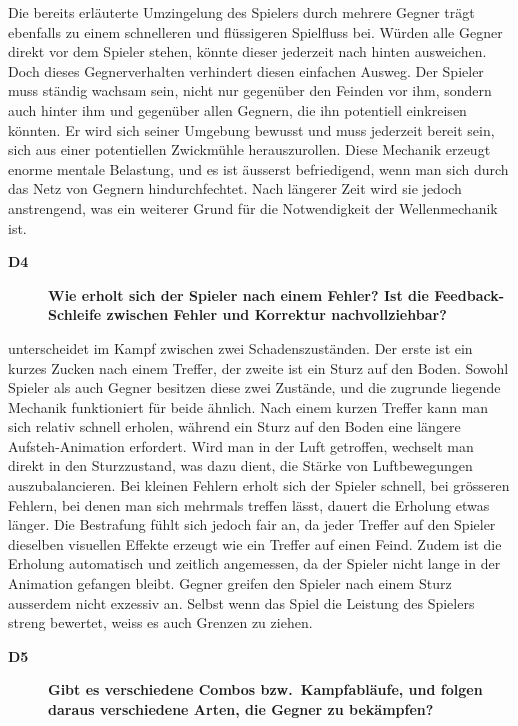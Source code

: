 \documentclass[../Main.tex]{subfiles}
\begin{document}
Die bereits erläuterte Umzingelung des Spielers durch mehrere Gegner trägt ebenfalls zu einem schnelleren und flüssigeren Spielfluss bei. Würden alle Gegner direkt vor dem Spieler stehen, könnte dieser jederzeit nach hinten ausweichen. Doch dieses Gegnerverhalten verhindert diesen einfachen Ausweg. Der Spieler muss ständig wachsam sein, nicht nur gegenüber den Feinden vor ihm, sondern auch hinter ihm und gegenüber allen Gegnern, die ihn potentiell einkreisen könnten. Er wird sich seiner Umgebung bewusst und muss jederzeit bereit sein, sich aus einer potentiellen Zwickmühle herauszurollen. Diese Mechanik erzeugt enorme mentale Belastung, und es ist äusserst befriedigend, wenn man sich durch das Netz von Gegnern hindurchfechtet. Nach längerer Zeit wird sie jedoch anstrengend, was ein weiterer Grund für die Notwendigkeit der Wellenmechanik ist.

\begin{description}
    \item[\textbf{D4}] \textbf{Wie erholt sich der Spieler nach einem Fehler? Ist die Feedback-Schleife zwischen Fehler und Korrektur nachvollziehbar?}
\end{description}

 unterscheidet im Kampf zwischen zwei Schadenszuständen. Der erste ist ein kurzes Zucken nach einem Treffer, der zweite ist ein Sturz auf den Boden. Sowohl Spieler als auch Gegner besitzen diese zwei Zustände, und die zugrunde liegende Mechanik funktioniert für beide ähnlich. Nach einem kurzen Treffer kann man sich relativ schnell erholen, während ein Sturz auf den Boden eine längere Aufsteh-Animation erfordert. Wird man in der Luft getroffen, wechselt man direkt in den Sturzzustand, was dazu dient, die Stärke von Luftbewegungen auszubalancieren. Bei kleinen Fehlern erholt sich der Spieler schnell, bei grösseren Fehlern, bei denen man sich mehrmals treffen lässt, dauert die Erholung etwas länger. Die Bestrafung fühlt sich jedoch fair an, da jeder Treffer auf den Spieler dieselben visuellen Effekte erzeugt wie ein Treffer auf einen Feind. Zudem ist die Erholung automatisch und zeitlich angemessen, da der Spieler nicht lange in der Animation gefangen bleibt. Gegner greifen den Spieler nach einem Sturz ausserdem nicht exzessiv an. Selbst wenn das Spiel die Leistung des Spielers streng bewertet, weiss es auch Grenzen zu ziehen.

\begin{description}
    \item[\textbf{D5}] \textbf{Gibt es verschiedene Combos bzw.\ Kampfabläufe, und folgen daraus verschiedene Arten, die Gegner zu bekämpfen?}
\end{description}
\end{document}
